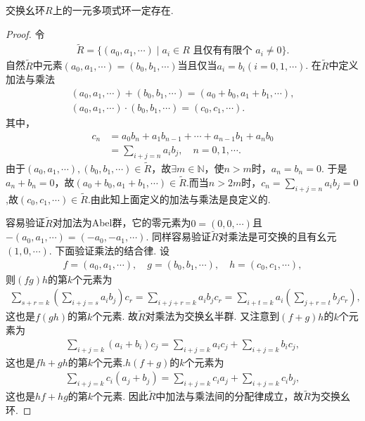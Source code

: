 \documentclass[../../main.tex]{subfiles}%
\begin{document}
\begin{theorem}\label{theorem:抽象代数--定理2.2.1}
交换幺环$R$上的一元多项式环一定存在.
\end{theorem}
\begin{proof}
令
\begin{align*}
\widetilde{R}=\{(a_0,a_1,\cdots)\mid a_i\in R\text{ 且仅有有限个 }a_i\neq 0\}.
\end{align*}
自然$\widetilde{R}$中元素$(a_0,a_1,\cdots)=(b_0,b_1,\cdots)$当且仅当$a_i=b_i(i=0,1,\cdots)$. 在$\widetilde{R}$中定义加法与乘法
\begin{gather}
(a_0,a_1,\cdots)+(b_0,b_1,\cdots)=(a_0+b_0,a_1+b_1,\cdots),\label{eq::::---03j8g4yu46yrsu64wijh2.2.1}\\
(a_0,a_1,\cdots)\cdot(b_0,b_1,\cdots)=(c_0,c_1,\cdots).\label{eq::::---03j8g4yu46yrsu64wijh2.2.2}
\end{gather}
其中，
\begin{align}
c_n&=a_0b_n+a_1b_{n-1}+\cdots+a_{n-1}b_1+a_nb_0\nonumber\\
&=\sum\limits_{i+j=n}a_ib_j,\quad n=0,1,\cdots.\label{eq::::---03j8g4yu46yrsu64wijh2.2.3}
\end{align}
由于$(a_0,a_1,\cdots),(b_0,b_1,\cdots)\in\widetilde{R}$，故$\exists m\in\mathbb{N}$，使$n>m$时，$a_n=b_n=0$. 于是$a_n+b_n=0$，故$(a_0+b_0,a_1+b_1,\cdots)\in \widetilde{R}$.而当$n>2m$时，$c_n=\sum\limits_{i+j=n}a_ib_j=0$,故$(c_0,c_1,\cdots)\in \widetilde{R}$.由此知上面定义的加法与乘法是良定义的.

容易验证$\widetilde{R}$对加法为Abel群，它的零元素为$0=(0,0,\cdots)$且$-(a_0,a_1,\cdots)=(-a_0,-a_1,\cdots)$.
同样容易验证$\widetilde{R}$对乘法是可交换的且有幺元$(1,0,\cdots)$. 下面验证乘法的结合律. 设
\begin{align*}
f=(a_0,a_1,\cdots),\quad g=(b_0,b_1,\cdots),\quad h=(c_0,c_1,\cdots),
\end{align*}
则$(fg)h$的第$k$个元素为
\begin{align*}
\sum\limits_{s+r=k}\left(\sum\limits_{i+j=s}a_ib_j\right)c_r=\sum\limits_{i+j+r=k}a_ib_jc_r
=\sum\limits_{i+t=k}a_i\left(\sum\limits_{j+r=t}b_jc_r\right),
\end{align*}
这也是$f(gh)$的第$k$个元素. 故$\widetilde{R}$对乘法为交换幺半群.
又注意到$(f+g)h$的$k$个元素为
\begin{align*}
\sum_{i+j=k}{\left( a_i+b_i \right) c_j}=\sum_{i+j=k}{a_ic_j}+\sum_{i+j=k}{b_ic_j},
\end{align*}
这也是$fh+gh$的第$k$个元素.$h(f+g)$的$k$个元素为
\begin{align*}
\sum_{i+j=k}{c_i\left( a_j+b_j \right)}=\sum_{i+j=k}{c_ia_j}+\sum_{i+j=k}{c_ib_j},
\end{align*}
这也是$hf+hg$的第$k$个元素.
因此$\widetilde{R}$中加法与乘法间的分配律成立，故$\widetilde{R}$为交换幺环.


\end{proof}
\end{document}
